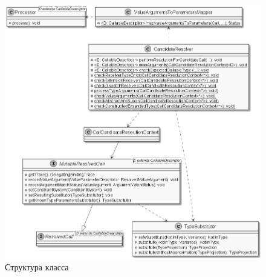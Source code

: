 \begin{figure}[htbp]
    \centering
    \includegraphics[width=\textwidth]{resources/06/13_candidate_resolver.png}
    \caption{Структура класса }
    \label{fig:candidate-resolver}
\end{figure}

